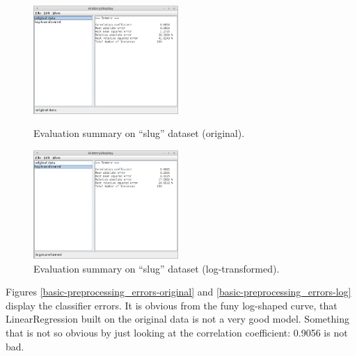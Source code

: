 \begin{figure}[ht]
  \begin{minipage}[t]{0.5\linewidth}
    \centering
    \includegraphics[width=5.5cm]{images/basic-preprocessing_summary-original.png}
    \caption{Evaluation summary on ``slug'' dataset (original).}
    \label{basic-preprocessing_summary-original}
  \end{minipage}
  \hspace{0.5cm}
  \begin{minipage}[t]{0.5\linewidth}
    \centering
    \includegraphics[width=5.5cm]{images/basic-preprocessing_summary-log.png}
    \caption{Evaluation summary on ``slug'' dataset (log-transformed).}
    \label{basic-preprocessing_summary-log}
  \end{minipage}
\end{figure}

Figures \ref{basic-preprocessing_errors-original} and
\ref{basic-preprocessing_errors-log} display the classifier errors. It is
obvious from the funy log-shaped curve, that LinearRegression built on the
original data is not a very good model. Something that is not so obvious by just
looking at the correlation coefficient: 0.9056 is not bad.

